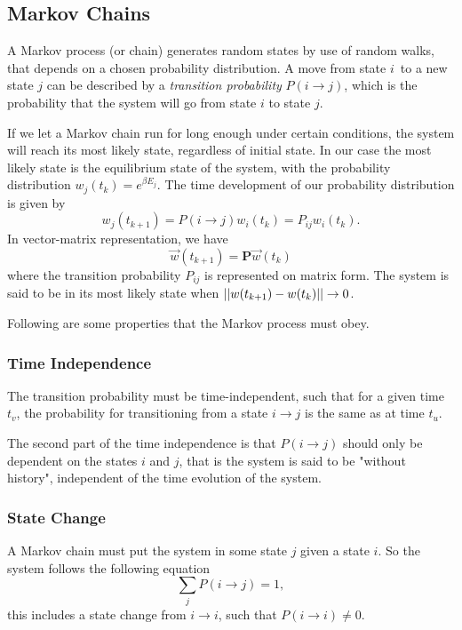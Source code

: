 \documentclass[%
reprint,
nofootinbib,
amsmath,amssymb,
aps,
]{revtex4-1}
\begin{document}
\subsection{Markov Chains}%
A Markov process (or chain) generates random states by use of random walks, that depends on a chosen probability distribution. A move from state $i$ to a new state $j$ can be described by a \textit{transition probability} $P(i\rightarrow j)$, which is the probability that the system will go from state $i$ to state $j$. 

If we let a Markov chain run for long enough under certain conditions, the system will reach its most likely state, regardless of initial state. In our case the most likely state is the equilibrium state of the system, with the probability distribution $w_j(t_k) = e^{\beta E_j}$. The time development of our probability distribution is given by 
\begin{equation}
	w_{j}(t_{k+1}) = P(i \rightarrow j)w_i(t_k) = P_{ij}w_i(t_k).
\end{equation}
In vector-matrix representation, we have 
\begin{equation}
	\vec{w}(t_{k+1}) = \mathbf{P}\vec{w}(t_k)
\end{equation}
where the transition probability $P_{ij}$ is represented on matrix form. 
The system is said to be in its most likely state when $\abs{\abs{w(t_{k+1}) - w(t_k)}} \rightarrow 0$. 

Following are some properties that the Markov process must obey. 
\subsubsection{Time Independence}%
The transition probability must be time-independent, such that for a given time $t_v$, the probability for transitioning from a state $i \rightarrow j$ is the same as at time $t_u$.

The second part of the time independence is that $P(i \rightarrow j)$ should only be dependent on the states $i$ and $j$, that is the system is said to be "without history", independent of the time evolution of the system. 
\subsubsection{State Change}%
A Markov chain must put the system in some state $j$ given a state $i$. So the system follows the following equation 
\begin{equation}
	\sum_j P(i\rightarrow j) = 1,
\end{equation}
this includes a state change from $i \rightarrow i$, such that $P(i \rightarrow i) \neq 0$.
\end{document}
